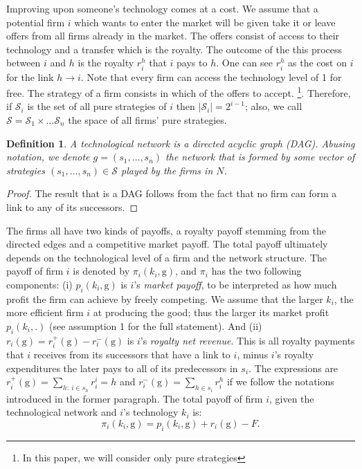 \documentclass{article}
\newtheorem{definition}{Definition}
\begin{document}
\indent Improving upon someone's technology comes at a cost. We assume that a potential firm $i$ which wants to enter the market will be given take it or leave offers from all firms already in the market. The offers consist of access to their technology and a transfer which is the royalty. The outcome of the this process between $i$ and $h$ is the royalty $r^{h}_i$ that $i$ pays to $h$. One can see $r^{h}_i$ as the cost on $i$ for the link $h\rightarrow i$. Note that every firm can access the technology level of 1 for free. 
\indent The strategy of a firm consists in which of the offers to accept. \footnote{In this paper, we will consider only pure strategies}. Therefore, if $\mathcal{S}_i$ is the set of all pure strategies of $i$ then $|\mathcal{S}_i|=2^{i-1}$; also, we call $\mathcal{S}=\mathcal{S}_1\times\ldots \mathcal{S}_n$ the space of all firms' pure strategies.  \\

\begin{definition}
A technological network  is a directed acyclic graph (DAG). Abusing notation, we denote $g=(s_1,\dots, s_n)$ the network that is formed by some vector of strategies $(s_1,\ldots, s_n)\in \mathcal{S}$ played by the firms in $N$. 
\end{definition}
\begin{proof}
The result that  is a DAG follows from the fact that no firm can form a link to any of its successors. 
\end{proof}



\indent The firms all have two kinds of payoffs, a royalty payoff stemming from the directed edges and a competitive market payoff. The total payoff ultimately depends on the technological level of a firm and the network structure. The payoff of firm $i$ is denoted by $\pi_i(k_i,\text{g})$, and $\pi_i$ has the two following components: (i) $p_i(k_i,\text{g})$ is $i$'s \textit{market payoff}, to be interpreted as how much profit the firm can achieve by freely competing. We assume that the larger $k_i$, the more efficient firm $i$ at producing the good; thus the larger its market profit $p_i(k_i,.)$ (see assumption 1 for the full statement). And (ii) $r_i(\text{g})=r_i^+(\text{g})-r_i^-(\text{g})$ is $i$'s \textit{royalty net revenue}. This is all royalty payments that $i$ receives from its successors that have a link to $i$, minus $i$'s royalty expenditures the later pays to all of its predecessors in $s_i$. The expressions are $r^+_i(\text{g})=\sum_{h:~ i\in s_h}r^i_i=h$ and $r^-_i(\text{g})=\sum_{h\in s_i} r^{h}_i$ if we follow the notations introduced in the former paragraph. The total payoff of firm $i$, given the technological network  and $i$'s technology $k_i$ is: 
\begin{equation}
    \pi_i(k_i,\text{g})=p_i(k_i,\text{g})+r_i(\text{g}) -F. 
\end{equation}
\end{document}
